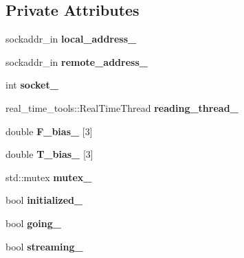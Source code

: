 \subsection*{Private Attributes}
\begin{DoxyCompactItemize}
\item 
sockaddr\+\_\+in {\bfseries local\+\_\+address\+\_\+}\hypertarget{classati__ft__sensor_1_1AtiFTSensor_adf13f1b427343f60330498ca0e98b9ea}{}\label{classati__ft__sensor_1_1AtiFTSensor_adf13f1b427343f60330498ca0e98b9ea}

\item 
sockaddr\+\_\+in {\bfseries remote\+\_\+address\+\_\+}\hypertarget{classati__ft__sensor_1_1AtiFTSensor_a6fc5b75e8a26437b6697862400c90690}{}\label{classati__ft__sensor_1_1AtiFTSensor_a6fc5b75e8a26437b6697862400c90690}

\item 
int {\bfseries socket\+\_\+}\hypertarget{classati__ft__sensor_1_1AtiFTSensor_affe56e51dc6cae8a4b456abb4db7fa35}{}\label{classati__ft__sensor_1_1AtiFTSensor_affe56e51dc6cae8a4b456abb4db7fa35}

\item 
real\+\_\+time\+\_\+tools\+::\+Real\+Time\+Thread {\bfseries reading\+\_\+thread\+\_\+}\hypertarget{classati__ft__sensor_1_1AtiFTSensor_ad0dde98310e810e75a5d1e03344ac3c5}{}\label{classati__ft__sensor_1_1AtiFTSensor_ad0dde98310e810e75a5d1e03344ac3c5}

\item 
double {\bfseries F\+\_\+bias\+\_\+} \mbox{[}3\mbox{]}\hypertarget{classati__ft__sensor_1_1AtiFTSensor_a36113d47f1a7c97f58c18d03c99da63c}{}\label{classati__ft__sensor_1_1AtiFTSensor_a36113d47f1a7c97f58c18d03c99da63c}

\item 
double {\bfseries T\+\_\+bias\+\_\+} \mbox{[}3\mbox{]}\hypertarget{classati__ft__sensor_1_1AtiFTSensor_a02280dd5595224c64b3031f79219a209}{}\label{classati__ft__sensor_1_1AtiFTSensor_a02280dd5595224c64b3031f79219a209}

\item 
std\+::mutex {\bfseries mutex\+\_\+}\hypertarget{classati__ft__sensor_1_1AtiFTSensor_a8513adb153671c83f8924c940a23791a}{}\label{classati__ft__sensor_1_1AtiFTSensor_a8513adb153671c83f8924c940a23791a}

\item 
bool {\bfseries initialized\+\_\+}\hypertarget{classati__ft__sensor_1_1AtiFTSensor_ada2c116afa79f3fff2885887cf3155f3}{}\label{classati__ft__sensor_1_1AtiFTSensor_ada2c116afa79f3fff2885887cf3155f3}

\item 
bool {\bfseries going\+\_\+}\hypertarget{classati__ft__sensor_1_1AtiFTSensor_a5b38378ea71b88a534959b165195778b}{}\label{classati__ft__sensor_1_1AtiFTSensor_a5b38378ea71b88a534959b165195778b}

\item 
bool {\bfseries streaming\+\_\+}\hypertarget{classati__ft__sensor_1_1AtiFTSensor_a82c97328a137772d0a1dac5d55793199}{}\label{classati__ft__sensor_1_1AtiFTSensor_a82c97328a137772d0a1dac5d55793199}

\end{DoxyCompactItemize}
